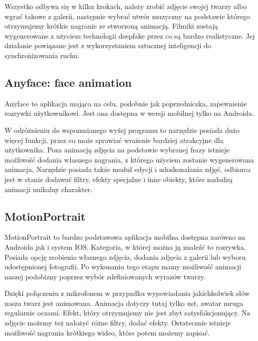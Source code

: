 Wszystko odbywa się w kilku krokach, należy zrobić zdjęcie swojej twarzy albo wgrać takowe z galerii, następnie wybrać utwór muzyczny na podstawie którego otrzymujemy krótkie nagranie ze stworzoną animacją. Filmiki zostają wygenerowane z użyciem technologii deepfake przez co są bardzo realistyczne. Jej działanie powiązane jest z wykorzystaniem sztucznej inteligencji do synchronizowania ruchu.


\subsection{Anyface: face animation}
Anyface \cite{anyface} to aplikacja mająca na celu, podobnie jak poprzedniczka, zapewnienie rozrywki użytkownikowi. Jest ona dostępna w wersji mobilnej tylko na Androida.

W odróżnieniu do wspomnianego wyżej programu to narzędzie posiada dużo więcej funkcji, przez co może sprawiać wrażenie bardziej atrakcyjne dla użytkownika. Poza animacją zdjęcia na podstawie wybranej frazy istnieje możliwość dodania własnego nagrania, z którego użyciem zostanie wygenerowana animacja. Narzędzie posiada także moduł edycji i udoskonalania zdjęć, odbiorca jest w stanie dodawać filtry, efekty specjalne i inne obiekty, które nadadzą animacji unikalny charakter. 


\subsection{MotionPortrait}
MotionPortrait \cite{motionportrait} to bardzo podstawowa aplikacja mobilna dostępna zarówno na Androida jak i system IOS. Kategoria, w której można ją znaleźć to rozrywka. Posiada opcję zrobienia własnego zdjęcia, dodania zdjęcia z galerii lub wyboru udostępnionej fotografii. Po wykonaniu tego etapu mamy możliwość animacji naszej podobizny poprzez wybór zdefiniowanych wyrazów twarzy. 

Dzięki połączeniu z mikrofonem w przypadku wypowiadania jakichkolwiek słów nasza twarz jest animowana. Animacja dotyczy tutaj tylko ust, awatar mruga regularnie oczami. Efekt, który otrzymujemy nie jest zbyt satysfakcjonujący. Na zdjęcie możemy też nałożyć różne filtry, dodać efekty. Ostatecznie istnieje możliwość nagrania krótkiego wideo, które potem możemy zapisać.

